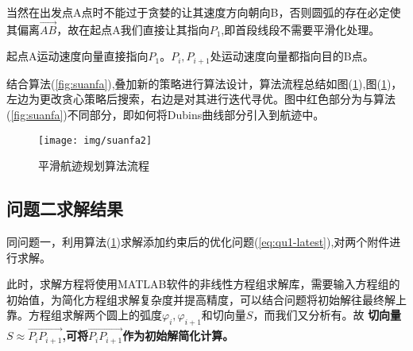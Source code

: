 当然在出发点A点时不能过于贪婪的让其速度方向朝向B，否则圆弧的存在必定使其偏离$\overrightarrow{AB}$，故在起点A我们直接让其指向$P_1$,即首段线段不需要平滑化处理。

\begin{mdframed} [%
	roundcorner=5pt,
	linecolor=gray!50,
	outerlinewidth=0.5pt,
	middlelinewidth=0.3pt, backgroundcolor=gray!2,
innertopmargin=\topskip, frametitle={问题二贪婪思想确定校正点单位运动速度向量},
frametitlefont= \bfseries,frametitlerule=true,frametitlealignment =\raggedright\noindent,
frametitlerulewidth=.5pt, frametitlebackgroundcolor=gray!2,]
起点A运动速度向量直接指向$P_1$。$P_i,P_{i+1}$处运动速度向量都指向目的B点。
\end{mdframed}

结合算法(\ref{fig:suanfa}),叠加新的策略进行算法设计，算法流程总结如图(\ref{fig:suanfa2}),图(\ref{fig:suanfa2})，左边为更改贪心策略后搜索，右边是对其进行迭代寻优。图中红色部分为与算法(\ref{fig:suanfa})不同部分，即如何将Dubins曲线部分引入到航迹中。
\begin{figure}[htbp!]
    \centering
    \texttt{[image: img/suanfa2]}
    \caption{平滑航迹规划算法流程}
    \label{fig:suanfa2}
\end{figure}

\subsection{问题二求解结果}
同问题一，利用算法(\ref{fig:suanfa2})求解添加约束后的优化问题(\ref{eq:qu1-latest}),对两个附件进行求解。

此时，求解方程将使用MATLAB软件的非线性方程组求解库，需要输入方程组的初始值，为简化方程组求解复杂度并提高精度，可以结合问题将初始解往最终解上靠。方程组求解两个圆上的弧度$\varphi_{i},\varphi_{i+1} $和切向量$S$，而我们又分析有{}。故
{\textbf{切向量$S\approx \overrightarrow{P_iP_{i+1}}$,可将$ \overrightarrow{P_iP_{i+1}}$作为初始解简化计算。}}

